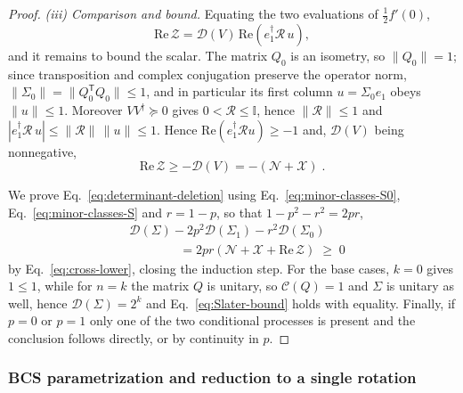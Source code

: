 \documentclass[prx,twocolumn,superscriptaddress,aps,10pt, frontmatterverbose, reprint,footinbib,longbibliography=true]{revtex4-2}
\newcommand{\trans}{\mathsf{T}}
\begin{document}
\begin{proof}
\emph{(iii) Comparison and bound.} Equating the two evaluations of $\tfrac12f'(0)$,
\begin{equation}
    \mathrm{Re}\,\mathcal{Z}=\mathcal{D}(V)\,\mathrm{Re}\!\left(e_1^\dagger\mathcal{R}\,u\right),
\end{equation}
and it remains to bound the scalar. The matrix $Q_0$ is an isometry, so $\lVert Q_0\rVert=1$; since transposition and complex conjugation preserve the operator norm, $\lVert\Sigma_0\rVert=\lVert Q_0^{\trans}Q_0\rVert\le1$, and in particular its first column $u=\Sigma_0e_1$ obeys $\lVert u\rVert\le1$. Moreover $VV^\dagger\succeq0$ gives $0<\mathcal{R}\le\mathbb{I}$, hence $\lVert\mathcal{R}\rVert\le1$ and $|e_1^\dagger\mathcal{R}\,u|\le\lVert\mathcal{R}\rVert\,\lVert u\rVert\le1$.
Hence $\mathrm{Re}(e_1^\dagger\mathcal{R}u)\ge-1$ and, $\mathcal{D}(V)$ being nonnegative,
\begin{equation}
    \mathrm{Re}\,\mathcal{Z}\ge-\mathcal{D}(V)=-(\mathcal{N}+\mathcal{X})\;.
    \label{eq:cross-lower}
\end{equation}

We prove Eq.~\eqref{eq:determinant-deletion} using Eq.~\eqref{eq:minor-classes-S0}, Eq.~\eqref{eq:minor-classes-S} and $r=1-p$, so that $1-p^2-r^2=2pr$,
\begin{equation}
\begin{split}
    &\mathcal{D}(\Sigma)-2p^2\mathcal{D}(\Sigma_1)-r^2\mathcal{D}(\Sigma_0)\\
    &\qquad\qquad =2pr\left(\mathcal{N}+\mathcal{X}+\mathrm{Re}\,\mathcal{Z}\right)\;\ge\;0
    \end{split}
\end{equation} 
by Eq.~\eqref{eq:cross-lower}, closing the induction step. For the base cases, $k=0$ gives $1\le1$, while for $n=k$ the matrix $Q$ is unitary, so $\mathcal{C}(Q)=1$ and $\Sigma$ is unitary as well, hence $\mathcal{D}(\Sigma)=2^k$ and Eq.~\eqref{eq:Slater-bound} holds with equality. Finally, if $p=0$ or $p=1$ only one of the two conditional processes is present and the conclusion follows directly, or by continuity in $p$.
\end{proof}

\subsubsection{ BCS parametrization and reduction to a single rotation}
\label{app:proof:thouless}
\end{document}

